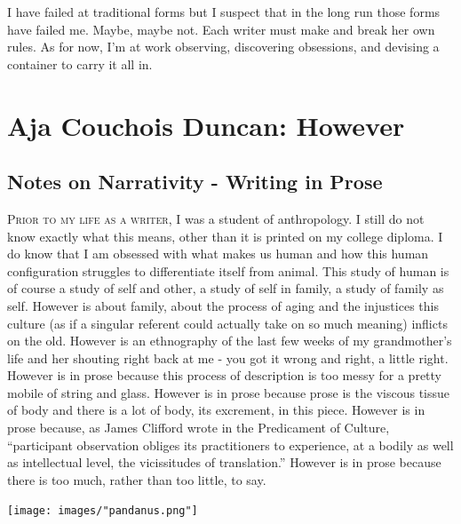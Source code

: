\documentclass[
]{memoir}
\begin{document}
I have failed at traditional forms but I suspect that in the long run
those forms have failed me. Maybe, maybe not. Each writer must make and
break her own rules. As for now, I'm at work observing, discovering
obsessions, and devising a container to carry it all in.

\hypertarget{aja-couchois-duncan-however}{%
\chapter{Aja Couchois Duncan:
However}\label{aja-couchois-duncan-however}}

\hypertarget{notes-on-narrativity---writing-in-prose}{%
\section*{Notes on Narrativity - Writing in
Prose}\label{notes-on-narrativity---writing-in-prose}}

\lettrine[lines=3, findent=0em, nindent=0.1em, lhang=0]{P}{rior to my life as a writer,}
I was a student of anthropology. I still do not know exactly what this
means, other than it is printed on my college diploma. I do know that I
am obsessed with what makes us human and how this human configuration
struggles to differentiate itself from animal. This study of human is of
course a study of self and other, a study of self in family, a study of
family as self. However is about family, about the process of aging and
the injustices this culture (as if a singular referent could actually
take on so much meaning) inflicts on the old. However is an ethnography
of the last few weeks of my grandmother's life and her shouting right
back at me - you got it wrong and right, a little right. However is in
prose because this process of description is too messy for a pretty
mobile of string and glass. However is in prose because prose is the
viscous tissue of body and there is a lot of body, its excrement, in
this piece. However is in prose because, as James Clifford wrote in the
Predicament of Culture, ``participant observation obliges its
practitioners to experience, at a bodily as well as intellectual level,
the vicissitudes of translation.'' However is in prose because there is
too much, rather than too little, to say.

\begin{center}\texttt{[image: images/"pandanus.png"]}\end{center}
\end{document}
